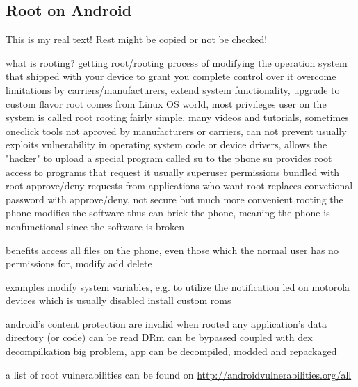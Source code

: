\subsection{Root on Android} \label{subsection:android-root}
This is my real text! Rest might be copied or not be checked!

%
what is rooting?
getting root/rooting process of modifying the operation system that shipped with your device to grant you complete control over it
overcome limitations by carriers/manufacturers, extend system functionality, upgrade to custom flavor
root comes from Linux OS world, most privileges user on the system is called root
rooting fairly simple, many videos and tutorials, sometimes oneclick tools
not aproved by manufacturers or carriers, can not prevent usually exploits vulnerability in operating system code or device drivers, allows the "hacker" to upload a special program called su to the phone
su provides root access to programs that request it
usually superuser permissions bundled with root
approve/deny requests from applications who want root
replaces convetional password with approve/deny, not secure but much more convenient
rooting the phone modifies the software thus can brick the phone, meaning the phone is nonfunctional since the software is broken

benefits
access all files on the phone, even those which the normal user has no permissions for, modify add delete

examples
modify system variables, e.g. to utilize the notification led on motorola devices which is usually disabled
install custom roms
\cite{androidpoliceRoot}
%

%
android's content protection are invalid when rooted
any application's data directory (or code) can be read
DRm can be bypassed
coupled with dex decompilkation big problem, app can be decompiled, modded and repackaged
\cite{levinAndevcon}
%

a list of root vulnerabilities can be found on \url{http://androidvulnerabilities.org/all}
